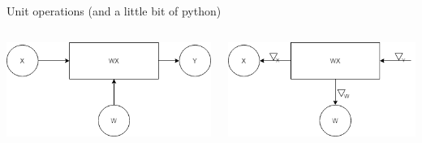 \begin{frame}{Unit operations (and a little bit of python)}
\begin{columns}
	\begin{column}{.5\textwidth}
		\includegraphics[width=.9\textwidth, center]{figuras/wx_forward_pass.png}
		
	\end{column}
	\begin{column}{.5\textwidth}
		\includegraphics[width=.9\textwidth, center]{figuras/wx_backward_pass.png}
		
	\end{column}
\end{columns}
\comment{
	{\tiny
		
}}
\end{frame}